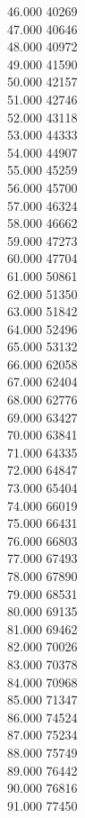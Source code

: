 { 46.000	40269 \\
 47.000	40646 \\
 48.000	40972 \\
 49.000	41590 \\
 50.000	42157 \\
 51.000	42746 \\
 52.000	43118 \\
 53.000	44333 \\
 54.000	44907 \\
 55.000	45259 \\
 56.000	45700 \\
 57.000	46324 \\
 58.000	46662 \\
 59.000	47273 \\
 60.000	47704 \\
 61.000	50861 \\
 62.000	51350 \\
 63.000	51842 \\
 64.000	52496 \\
 65.000	53132 \\
 66.000	62058 \\
 67.000	62404 \\
 68.000	62776 \\
 69.000	63427 \\
 70.000	63841 \\
 71.000	64335 \\
 72.000	64847 \\
 73.000	65404 \\
 74.000	66019 \\
 75.000	66431 \\
 76.000	66803 \\
 77.000	67493 \\
 78.000	67890 \\
 79.000	68531 \\
 80.000	69135 \\
 81.000	69462 \\
 82.000	70026 \\
 83.000	70378 \\
 84.000	70968 \\
 85.000	71347 \\
 86.000	74524 \\
 87.000	75234 \\
 88.000	75749 \\
 89.000	76442 \\
 90.000	76816 \\
 91.000	77450 \\
}
